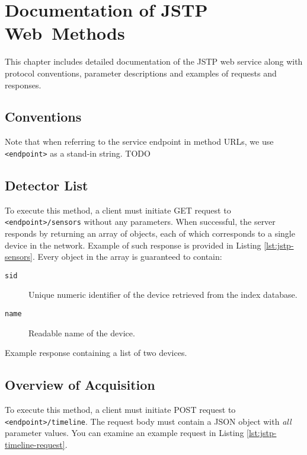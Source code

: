 \chapter{Documentation of JSTP Web~Methods}
\label{apx:jstp-doc}
This chapter includes detailed documentation of the JSTP web service along with protocol conventions, parameter descriptions and examples of requests and responses.

\section{Conventions}
Note that when referring to the service endpoint in method URLs, we use \texttt{<endpoint>} as a stand-in string.
TODO

\section{Detector List}
\label{apx:jstp-sensors}
To execute this method, a client must initiate GET request to \texttt{<endpoint>/sensors} without any parameters. When successful, the server responds by returning an array of objects, each of which corresponds to a single device in the network. Example of such response is provided in Listing \ref{lst:jstp-sensors}. Every object in the array is guaranteed to contain:

\begin{description}
	\item[\texttt{sid}]
	Unique numeric identifier of the device retrieved from the index database.

	\item[\texttt{name}]
	Readable name of the device.
\end{description}

\begin{listing}
    \caption{Example response containing a list of two devices.}
    \label{lst:jstp-sensors}
\end{listing}


\section{Overview of Acquisition}
\label{apx:jstp-timeline}
To execute this method, a client must initiate POST request to \texttt{<endpoint>/timeline}. The request body must contain a JSON object with \textit{all} parameter values. You can examine an example request in Listing \ref{lst:jstp-timeline-request}.

